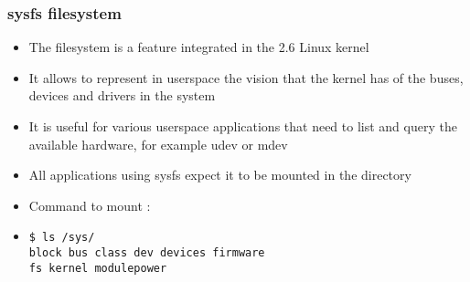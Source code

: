 \begin{frame}[fragile]
  \frametitle{sysfs filesystem}
  \begin{itemize}
  \item The  filesystem is a feature integrated in the 2.6
    Linux kernel
  \item It allows to represent in userspace the vision that the kernel
    has of the buses, devices and drivers in the system
  \item It is useful for various userspace applications that need to
    list and query the available hardware, for example udev or mdev
  \item All applications using sysfs expect it to be mounted in the
     directory
  \item Command to mount :\\
  \item
\begin{verbatim}
$ ls /sys/
block bus class dev devices firmware
fs kernel modulepower
\end{verbatim}
  \end{itemize}
\end{frame}
